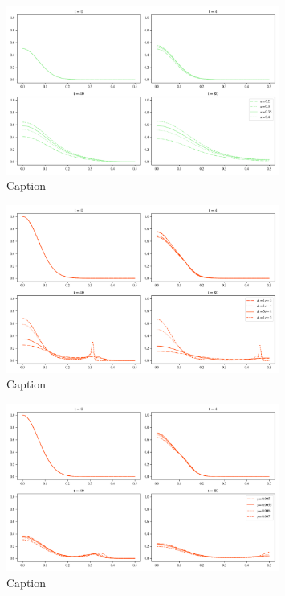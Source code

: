 \begin{figure}[h]
    \centering
    \includegraphics[width=0.8\textwidth]{resources/images/alpha_comparison.png}
    \caption{Caption}
    \label{fig:replication_alpha_comparison}
\end{figure}

\begin{figure}[h]
    \centering
    \includegraphics[width=0.8\textwidth]{resources/images/dc_comparison.png}
    \caption{Caption}
    \label{fig:replication_dc_comparison}
\end{figure}

\begin{figure}[h]
    \centering
    \includegraphics[width=0.8\textwidth]{resources/images/gamma_comparison.png}
    \caption{Caption}
    \label{fig:replication_gamma_comparison}
\end{figure}



